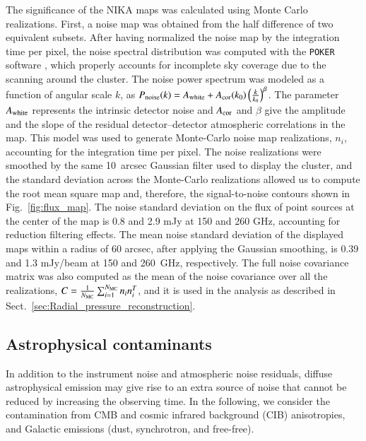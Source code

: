 \documentclass[traditabstract]{aa}
\begin{document}
The significance of the NIKA maps was calculated using Monte Carlo realizations. First, a noise map was obtained from the half difference of two equivalent subsets. After having normalized the noise map by the integration time per pixel, the noise spectral distribution was computed with the {\tt POKER} software \citep{ponthieu2011}, which properly accounts for incomplete sky coverage due to the scanning around the cluster. The noise power spectrum was modeled as a function of angular scale $k$, as $P_{\rm noise}(k) = A_{\rm white} + A_{\rm cor}(k_0) \left(\frac{k}{k_0}\right)^{\beta}$. The parameter $A_{\rm white}$ represents the intrinsic detector noise and $A_{\rm cor}$ and $\beta$ give the amplitude and the slope of the residual detector--detector atmospheric correlations in the map. This model was used to generate Monte-Carlo noise map realizations, $n_i$, accounting for the integration time per pixel. The noise realizations were smoothed by the same 10~arcsec Gaussian filter used to display the cluster, and the standard deviation across the Monte-Carlo realizations allowed us to compute the root mean square map and, therefore, the signal-to-noise contours shown in Fig.~\ref{fig:flux_map}. The noise standard deviation on the flux of point sources at the center of the map is 0.8 and 2.9 mJy at 150 and 260 GHz, accounting for reduction filtering effects. The mean noise standard deviation of the displayed maps within a radius of 60 arcsec, after applying the Gaussian smoothing, is 0.39 and 1.3 mJy/beam at 150 and 260~GHz, respectively. The full noise covariance matrix was also computed as the mean of the noise covariance over all the realizations, $C = \frac{1}{N_{\rm MC}}\sum_{i=1}^{N_{\rm MC}}n_i n_i^{T}$, and it is used in the analysis as described in Sect.~\ref{sec:Radial_pressure_reconstruction}.

\subsection{Astrophysical contaminants}\label{sec:astrophysical_contaminant}
In addition to the instrument noise and atmospheric noise residuals, diffuse astrophysical emission may give rise to an extra source of noise that cannot be reduced by increasing the observing time. In the following, we consider the contamination from CMB and cosmic infrared background (CIB) anisotropies, and Galactic emissions (dust, synchrotron, and free-free). 
\end{document}

